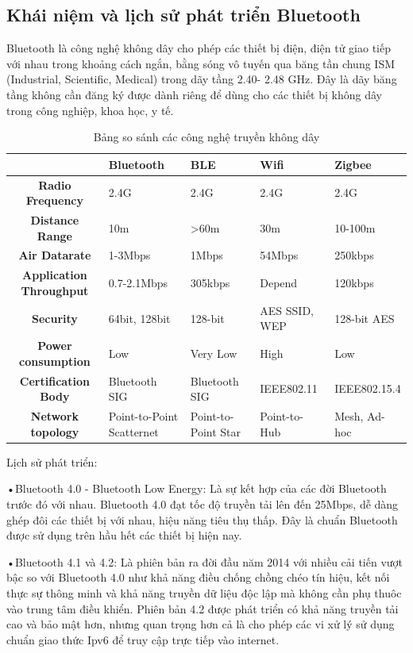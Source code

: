 \subsection{Khái niệm và lịch sử phát triển Bluetooth}
Bluetooth là công nghệ không dây cho phép các thiết bị điện, điện tử giao tiếp với nhau trong khoảng cách ngắn, bằng sóng vô tuyến qua băng tần chung ISM (Industrial, Scientific, Medical) trong dãy tầng 2.40- 2.48 GHz. Đây là dãy băng tầng không cần đăng ký được dành riêng để dùng cho các thiết bị không dây trong công nghiệp, khoa học, y tế.

	\begin{table}[ht]
		\begin{tabular}{ |c|m{2cm}|m{2cm}|m{2cm}|m{2cm}| } 
			\hline
			& \textbf{Bluetooth} & \textbf{BLE} & \textbf{Wifi} & \textbf{Zigbee} \\ 
			\hline
			\textbf{Radio Frequency} &	2.4G &	2.4G &	2.4G &	2.4G \\ 
			\hline
			\textbf{Distance Range} &	10m	&>60m &	30m	& 10-100m \\ 
			\hline
			\textbf{Air Datarate} &	1-3Mbps &	1Mbps &	54Mbps &	250kbps \\
			\hline
			\textbf{Application Throughput} &	0.7-2.1Mbps &	305kbps &Depend &120kbps\\
			\hline
			\textbf{Security} &	64bit, 128bit &	128-bit & AES	SSID, WEP&	128-bit AES \\
			\hline
			\textbf{Power consumption}&	Low	&Very Low&	High&	Low \\
			\hline
			\textbf{Certification Body}&	Bluetooth SIG&	Bluetooth SIG&	IEEE802.11&	IEEE802.15.4 \\
			\hline
			\textbf{Network topology} &	Point-to-Point Scatternet&	Point-to-Point Star&	Point-to-Hub& 		Mesh, Ad-hoc\\
			\hline
		\end{tabular}
		\caption {Bảng so sánh các công nghệ truyền không dây}
		\label{table:1.1}
	\end{table}


Lịch sử phát triển: \cite{tgdd}

•Bluetooth 4.0 - Bluetooth Low Energy: Là sự kết hợp của các đời Bluetooth trước đó với nhau. Bluetooth 4.0 đạt tốc độ truyền tải lên đến 25Mbps, dễ dàng ghép đôi các thiết bị với nhau, hiệu năng tiêu thụ thấp. Đây là chuẩn Bluetooth được sử dụng trên hầu hết các thiết bị hiện nay.

•Bluetooth 4.1 và 4.2: Là phiên bản ra đời đầu năm 2014 với nhiều cải tiến vượt bậc so với Bluetooth 4.0 như khả năng điều chống chồng chéo tín hiệu, kết nối thực sự thông minh và khả năng truyền dữ liệu độc lập mà không cần phụ thuôc vào trung tâm điều khiển. Phiên bản 4.2 được phát triển có khả năng truyền tải cao và bảo mật hơn, nhưng quan trọng hơn cả là cho phép các vi xử lý sử dụng chuẩn giao thức Ipv6 để truy cập trực tiếp vào internet.

